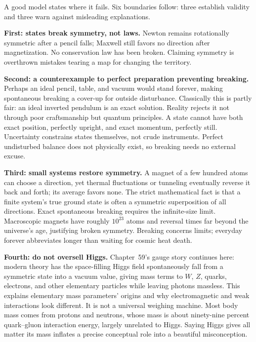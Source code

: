 \begin{mainline}
A good model states where it fails. Six boundaries follow: three establish validity and three warn against misleading explanations.

\textbf{First: states break symmetry, not laws.} Newton remains rotationally symmetric after a pencil falls; Maxwell still favors no direction after magnetization. No conservation law has been broken. Claiming symmetry is overthrown mistakes tearing a map for changing the territory.

\textbf{Second: a counterexample to perfect preparation preventing breaking.} Perhaps an ideal pencil, table, and vacuum would stand forever, making spontaneous breaking a cover-up for outside disturbance. Classically this is partly fair: an ideal inverted pendulum is an exact solution. Reality rejects it not through poor craftsmanship but quantum principles. A state cannot have both exact position, perfectly upright, and exact momentum, perfectly still. Uncertainty constrains states themselves, not crude instruments. Perfect undisturbed balance does not physically exist, so breaking needs no external excuse.

\textbf{Third: small systems restore symmetry.} A magnet of a few hundred atoms can choose a direction, yet thermal fluctuations or tunneling eventually reverse it back and forth; its average favors none. The strict mathematical fact is that a finite system's true ground state is often a symmetric superposition of all directions. Exact spontaneous breaking requires the infinite-size limit. Macroscopic magnets have roughly \(10^{23}\) atoms and reversal times far beyond the universe's age, justifying broken symmetry. Breaking concerns limits; everyday forever abbreviates longer than waiting for cosmic heat death.

\textbf{Fourth: do not oversell Higgs.} Chapter~59's gauge story continues here: modern theory has the space-filling Higgs field spontaneously fall from a symmetric state into a vacuum value, giving mass terms to \(W\), \(Z\), quarks, electrons, and other elementary particles while leaving photons massless. This explains elementary mass parameters' origins and why electromagnetic and weak interactions look different. It is not a universal weighing machine. Most body mass comes from protons and neutrons, whose mass is about ninety-nine percent quark--gluon interaction energy, largely unrelated to Higgs. Saying Higgs gives all matter its mass inflates a precise conceptual role into a beautiful misconception.


\end{mainline}
